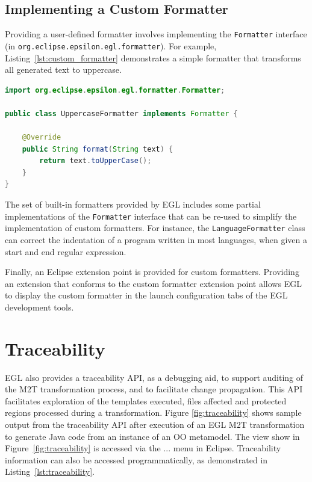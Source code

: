 \subsection{Implementing a Custom Formatter}
\label{sec:custom_formatter}
Providing a user-defined formatter involves implementing the \texttt{Fo\-rm\-at\-ter} 
interface (in \texttt{org.eclipse.epsilon.egl.formatter}). For example, 
Listing~\ref{lst:custom_formatter} demonstrates a simple formatter that 
transforms all generated text to uppercase.

\begin{lstlisting}[basicstyle=\ttfamily\footnotesize, language=Java, tabsize=2, flexiblecolumns=true, caption=A simple custom formatter that transforms text to uppercase., label=lst:custom_formatter]
import org.eclipse.epsilon.egl.formatter.Formatter;

public class UppercaseFormatter implements Formatter {

	@Override
	public String format(String text) {
		return text.toUpperCase();
	}
}
\end{lstlisting}

The set of built-in formatters provided by EGL includes some partial 
implementations of the \texttt{Fo\-rm\-at\-ter} interface that can be
re-used to simplify the implementation of custom formatters. For instance,
the \texttt{Lan\-gu\-a\-geFo\-rm\-at\-t\-er} class can correct the indentation 
of a program written in most languages, when given a start and end regular
expression.

Finally, an Eclipse extension point is provided for custom formatters. Providing 
an extension that conforms to the custom formatter extension point allows EGL to
display the custom formatter in the launch configuration tabs of the EGL development tools.

\section{Traceability} 
EGL also provides a traceability API, as a debugging aid, to
support auditing of the M2T transformation process, and to facilitate
change propagation.  This API facilitates exploration of the templates 
executed, files affected and protected regions processed during a transformation. 
Figure \ref{fig:traceability} shows sample output from the traceability API
after execution of an EGL M2T transformation to generate Java
code from an instance of an OO metamodel. The view show in Figure~\ref{fig:traceability}
is accessed via the ... menu in Eclipse. Traceability information can
also be accessed programmatically, as demonstrated in Listing~\ref{lst:traceability}.

